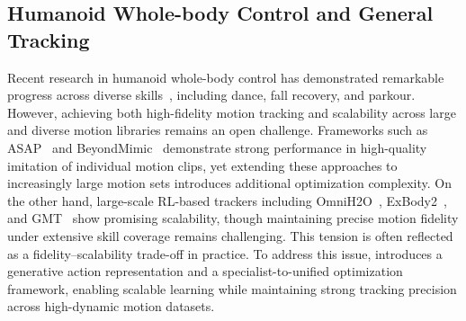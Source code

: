 \subsection{Humanoid Whole-body Control and General Tracking}
Recent research in humanoid whole-body control has demonstrated remarkable progress across diverse skills~\cite{zhuang2024humanoid,huang2025learning,humanup25,zhang2025hub,overchall}, including dance, fall recovery, and parkour. 
However, achieving both high-fidelity motion tracking and scalability across large and diverse motion libraries remains an open challenge. 
Frameworks such as ASAP~\cite{he2025asap} and BeyondMimic~\cite{liao2025beyondmimic} demonstrate strong performance in high-quality imitation of individual motion clips, yet extending these approaches to increasingly large motion sets introduces additional optimization complexity. 
On the other hand, large-scale RL-based trackers including OmniH2O~\cite{he2024omnih2o}, ExBody2~\cite{ji2024exbody2}, and GMT~\cite{chen2025gmt} show promising scalability, though maintaining precise motion fidelity under extensive skill coverage remains challenging. 
This tension is often reflected as a fidelity–scalability trade-off in practice. 
To address this issue, \model introduces a generative action representation and a specialist-to-unified optimization framework, enabling scalable learning while maintaining strong tracking precision across high-dynamic motion datasets.

